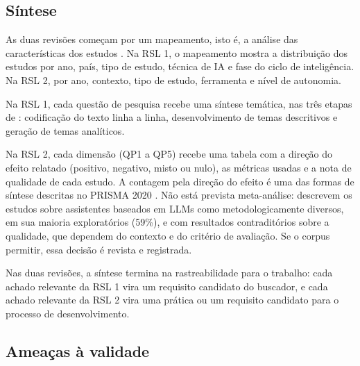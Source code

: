 \subsection{Síntese}

As duas revisões começam por um mapeamento, isto é, a análise das
características dos estudos \cite[seção 4.2]{kitchenham2023segress}. Na RSL 1,
o mapeamento mostra a distribuição dos estudos por ano, país, tipo de estudo,
técnica de IA e fase do ciclo de inteligência. Na RSL 2, por ano, contexto,
tipo de estudo, ferramenta e nível de autonomia.

Na RSL 1, cada questão de pesquisa recebe uma síntese temática, nas três
etapas de : codificação do texto linha a linha,
desenvolvimento de temas descritivos e geração de temas analíticos.

Na RSL 2, cada dimensão (QP1 a QP5) recebe uma tabela com a direção do efeito
relatado (positivo, negativo, misto ou nulo), as métricas usadas e a nota de
qualidade de cada estudo. A contagem pela direção do efeito é uma das formas
de síntese descritas no PRISMA 2020 \cite[quadro 1]{page2021ee}. Não está
prevista meta-análise:  descrevem os estudos sobre
assistentes baseados em LLMs como metodologicamente diversos, em sua maioria
exploratórios (59\%), e com resultados contraditórios sobre a qualidade, que
dependem do contexto e do critério de avaliação. Se o corpus permitir, essa
decisão é revista e registrada.

Nas duas revisões, a síntese termina na rastreabilidade para o trabalho: cada
achado relevante da RSL 1 vira um requisito candidato do buscador, e cada
achado relevante da RSL 2 vira uma prática ou um requisito candidato para o
processo de desenvolvimento.



\subsection{Ameaças à validade}
\label{sec:metodologia-ameacas}

